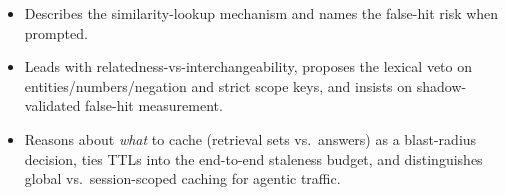 \begin{interviewq}

\goodgreat
\begin{itemize}
    \item {} Describes the similarity-lookup mechanism and names the false-hit risk when prompted.
    \item {} Leads with relatedness-vs-interchangeability, proposes the lexical veto on entities/numbers/negation and strict scope keys, and insists on shadow-validated false-hit measurement.
    \item {} Reasons about \textit{what} to cache (retrieval sets vs.\ answers) as a blast-radius decision, ties TTLs into the end-to-end staleness budget, and distinguishes global vs.\ session-scoped caching for agentic traffic.
\end{itemize}

\end{interviewq}

